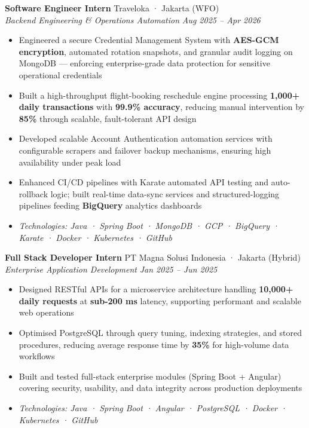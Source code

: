 \documentclass[10pt,a4paper]{article}
\newcommand{\experienceheader}[4]{
    \textbf{#1} \hfill #2 \\
    \textit{#3} \hfill \textit{#4}
}
\begin{document}
\experienceheader{Software Engineer Intern}{Traveloka · Jakarta (WFO)}{Backend Engineering \& Operations Automation}{Aug 2025 -- Apr 2026}
\begin{itemize}[leftmargin=*, itemsep=1pt, topsep=1pt]
    \item Engineered a secure Credential Management System with \textbf{AES-GCM encryption}, automated rotation snapshots, and granular audit logging on MongoDB — enforcing enterprise-grade data protection for sensitive operational credentials
    \item Built a high-throughput flight-booking reschedule engine processing \textbf{1,000+ daily transactions} with \textbf{99.9\% accuracy}, reducing manual intervention by \textbf{85\%} through scalable, fault-tolerant API design
    \item Developed scalable Account Authentication automation services with configurable scrapers and failover backup mechanisms, ensuring high availability under peak load
    \item Enhanced CI/CD pipelines with Karate automated API testing and auto-rollback logic; built real-time data-sync services and structured-logging pipelines feeding \textbf{BigQuery} analytics dashboards
    \item \textit{Technologies: Java · Spring Boot · MongoDB · GCP · BigQuery · Karate · Docker · Kubernetes · GitHub}
\end{itemize}

\vspace{2pt}

\experienceheader{Full Stack Developer Intern}{PT Magna Solusi Indonesia · Jakarta (Hybrid)}{Enterprise Application Development}{Jan 2025 -- Jun 2025}
\begin{itemize}[leftmargin=*, itemsep=1pt, topsep=1pt]
    \item Designed RESTful APIs for a microservice architecture handling \textbf{10,000+ daily requests} at \textbf{sub-200 ms} latency, supporting performant and scalable web operations
    \item Optimised PostgreSQL through query tuning, indexing strategies, and stored procedures, reducing average response time by \textbf{35\%} for high-volume data workflows
    \item Built and tested full-stack enterprise modules (Spring Boot + Angular) covering security, usability, and data integrity across production deployments
    \item \textit{Technologies: Java · Spring Boot · Angular · PostgreSQL · Docker · Kubernetes · GitHub}
\end{itemize}
\end{document}
